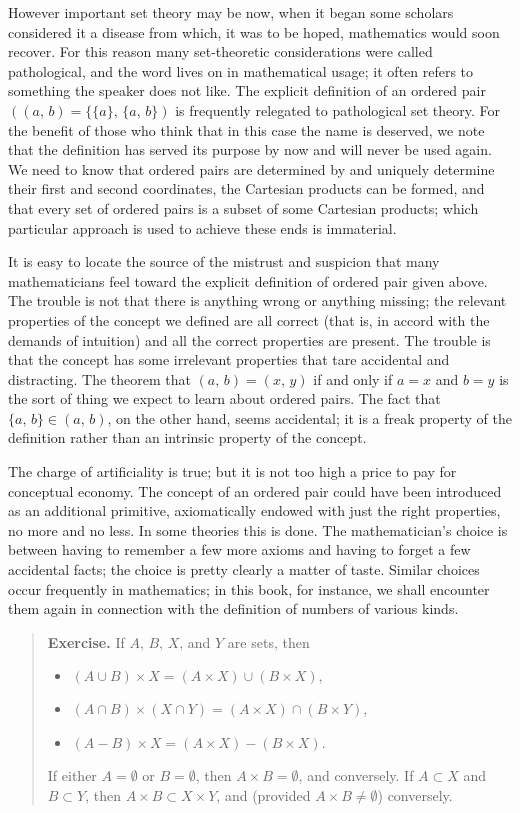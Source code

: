 However important set theory may be now, when it began some scholars considered it a disease from which, it was to be hoped, mathematics would soon recover. For this reason many set-theoretic considerations were called pathological, and the word lives on in mathematical usage; it often refers to something the speaker does not like. The explicit definition of an ordered pair $((a,\, b) = \{\{a\}, \, \{a, \, b\})$ is frequently relegated to pathological set theory. For the benefit of those who think that in this case the name is deserved, we note that the definition has served its purpose by now and will never be used again. We need to know that ordered pairs are determined by and uniquely determine their first and second coordinates, the Cartesian products can be formed, and that every set of ordered pairs is a subset of some Cartesian products; which particular approach is used to achieve these ends is immaterial.

It is easy to locate the source of the mistrust and suspicion that many mathematicians feel toward the explicit definition of ordered pair given above. The trouble is not that there is anything wrong or anything missing; the relevant properties of the concept we defined are all correct (that is, in accord with the demands of intuition) and all the correct properties are present. The trouble is that the concept has some irrelevant properties that tare accidental and distracting. The theorem that $(a, \, b) = (x, \, y)$ if and only if $a = x$ and $b = y$ is the sort of thing we expect to learn about ordered pairs. The fact that $\{a, \, b\} \in (a, \, b)$, on the other hand, seems accidental; it is a freak property of the definition rather than an intrinsic property of the concept.

The charge of artificiality is true; but it is not too high a price to pay for conceptual economy. The concept of an ordered pair could have been introduced as an additional primitive, axiomatically endowed with just the right properties, no more and no less. In some theories this is done. The mathematician's choice is between having to remember a few more axioms and having to forget a few accidental facts; the choice is pretty clearly a matter of taste. Similar choices occur frequently in mathematics; in this book, for instance, we shall encounter them again in connection with the definition of numbers of various kinds.

\begin{quote}
	\textbf{Exercise.} If $A, \, B, \, X$, and $Y$ are sets, then
	\begin{itemize}
		\item $(A \cup B) \times X = (A \times X) \cup (B \times X),$
		\item $(A \cap B) \times (X \cap Y) = (A \times X) \cap (B \times Y)$,
		\item $(A - B) \times X = (A \times X) - (B \times X).$
	\end{itemize}
	If either $A = \emptyset$ or $B = \emptyset$, then $A \times B = \emptyset$, and conversely. If $A \subset X$ and $B \subset Y$, then $A \times B \subset X \times Y$, and (provided $A \times B \neq \emptyset$) conversely.
\end{quote}

